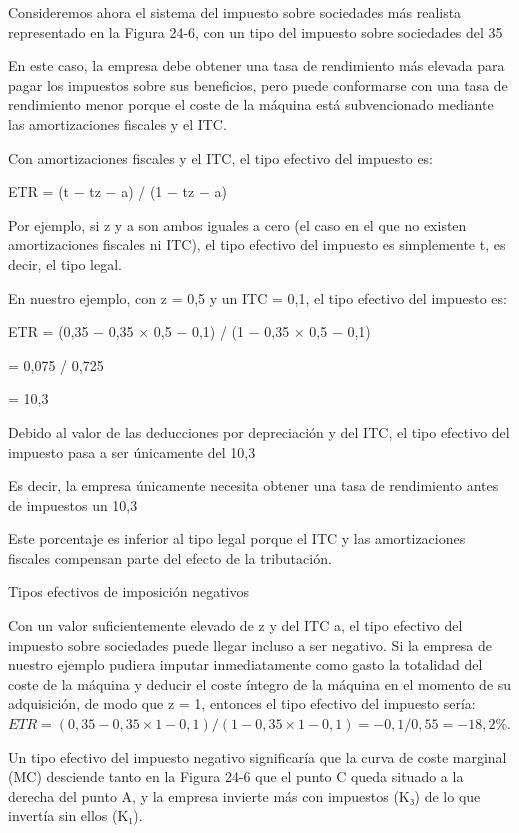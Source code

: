 \documentclass[10pt,a4paper]{article}
\begin{document}
Consideremos ahora el sistema del impuesto sobre sociedades más realista representado en la Figura 24-6, con un tipo del impuesto sobre sociedades del 35 %

En este caso, la empresa debe obtener una tasa de rendimiento más elevada para pagar los impuestos sobre sus beneficios, pero puede conformarse con una tasa de rendimiento menor porque el coste de la máquina está subvencionado mediante las amortizaciones fiscales y el ITC.

Con amortizaciones fiscales y el ITC, el tipo efectivo del impuesto es:

ETR = (t − tz − a) / (1 − tz − a)

Por ejemplo, si z y a son ambos iguales a cero (el caso en el que no existen amortizaciones fiscales ni ITC), el tipo efectivo del impuesto es simplemente t, es decir, el tipo legal.

En nuestro ejemplo, con z = 0,5 y un ITC = 0,1, el tipo efectivo del impuesto es:

ETR = (0,35 − 0,35 × 0,5 − 0,1) / (1 − 0,35 × 0,5 − 0,1)

= 0,075 / 0,725

= 10,3 %

Debido al valor de las deducciones por depreciación y del ITC, el tipo efectivo del impuesto pasa a ser únicamente del 10,3 %

Es decir, la empresa únicamente necesita obtener una tasa de rendimiento antes de impuestos un 10,3 %

Este porcentaje es inferior al tipo legal porque el ITC y las amortizaciones fiscales compensan parte del efecto de la tributación.

Tipos efectivos de imposición negativos

Con un valor suficientemente elevado de z y del ITC a, el tipo efectivo del impuesto sobre sociedades puede llegar incluso a ser negativo. Si la empresa de nuestro ejemplo pudiera imputar inmediatamente como gasto la totalidad del coste de la máquina y deducir el coste íntegro de la máquina en el momento de su adquisición, de modo que z = 1, entonces el tipo efectivo del impuesto sería: $ETR = (0,35 − 0,35 × 1 − 0,1) / (1 − 0,35 × 1 − 0,1)= −0,1 / 0,55= −18,2 \%.$

Un tipo efectivo del impuesto negativo significaría que la curva de coste marginal (MC) desciende tanto en la Figura 24-6 que el punto C queda situado a la derecha del punto A, y la empresa invierte más con impuestos (K₃) de lo que invertía sin ellos (K₁).
\end{document}

